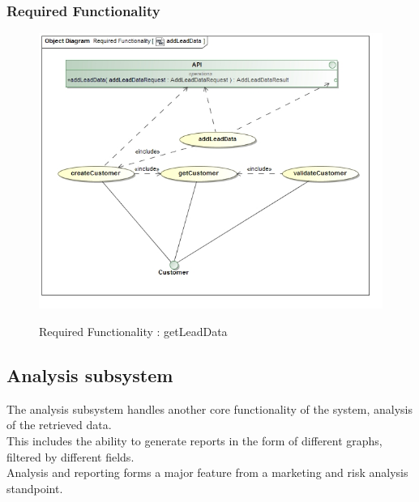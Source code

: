 \documentclass{article}
\begin{document}
		\subsubsection{Required Functionality}

		\begin{figure}[H]
		\includegraphics[width=\textwidth]{images/obj__Required_Functionality__addLeadData.jpg}  \\
		\caption{Required Functionality : getLeadData}
		\end{figure}

		
	\pagebreak
	\subsection{Analysis subsystem}\label{subsec:Analysis}
	The analysis subsystem handles another core functionality of the system, analysis of the retrieved data.\\ This includes the ability to generate reports in the form of different graphs, filtered by different fields.\\ Analysis and reporting forms a major feature from a marketing and risk analysis standpoint.
\end{document}

